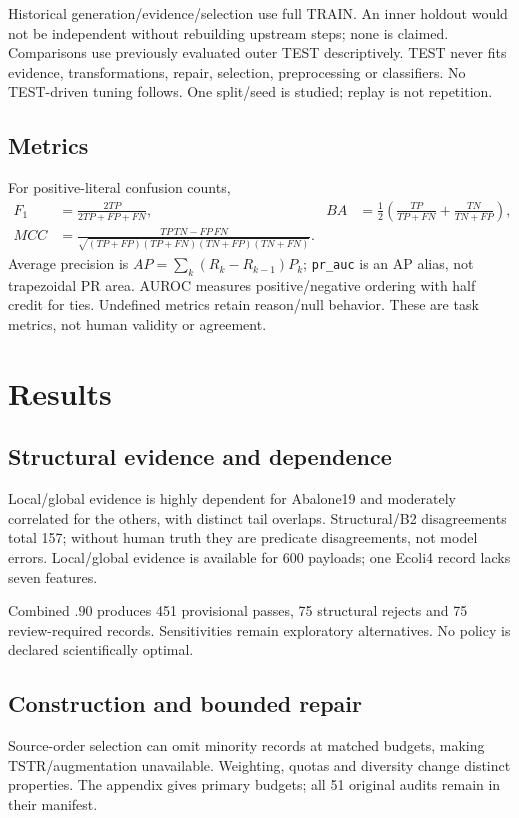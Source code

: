 Historical generation/evidence/selection use full TRAIN. An inner holdout would not be independent without rebuilding upstream steps; none is claimed. Comparisons use previously evaluated outer TEST descriptively. TEST never fits evidence, transformations, repair, selection, preprocessing or classifiers. No TEST-driven tuning follows. One split/seed is studied; replay is not repetition.

\subsection{Metrics}
For positive-literal confusion counts,
\begin{align}
F_1&=\frac{2TP}{2TP+FP+FN},&
BA&=\frac12\left(\frac{TP}{TP+FN}+\frac{TN}{TN+FP}\right),\\
MCC&=\frac{TP\,TN-FP\,FN}{\sqrt{(TP+FP)(TP+FN)(TN+FP)(TN+FN)}}.
\end{align}
Average precision is $AP=\sum_k(R_k-R_{k-1})P_k$; \texttt{pr\_auc} is an AP alias, not trapezoidal PR area. AUROC measures positive/negative ordering with half credit for ties. Undefined metrics retain reason/null behavior. These are task metrics, not human validity or agreement.

\section{Results}
\subsection{Structural evidence and dependence}

Local/global evidence is highly dependent for Abalone19 and moderately correlated for the others, with distinct tail overlaps. Structural/B2 disagreements total 157; without human truth they are predicate disagreements, not model errors. Local/global evidence is available for 600 payloads; one Ecoli4 record lacks seven features.


Combined $.90$ produces 451 provisional passes, 75 structural rejects and 75 review-required records. Sensitivities remain exploratory alternatives. No policy is declared scientifically optimal.

\subsection{Construction and bounded repair}
Source-order selection can omit minority records at matched budgets, making TSTR/augmentation unavailable. Weighting, quotas and diversity change distinct properties. The appendix gives primary budgets; all 51 original audits remain in their manifest.

